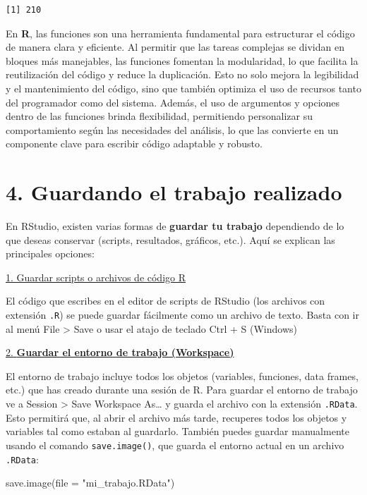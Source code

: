 \documentclass[
  letterpaper,
  DIV=11,
  numbers=noendperiod]{scrreprt}
\newenvironment{Shaded}{\begin{snugshade}}{\end{snugshade}}
\newcommand{\AttributeTok}[1]{\textcolor[rgb]{0.40,0.45,0.13}{#1}}
\newcommand{\FunctionTok}[1]{\textcolor[rgb]{0.28,0.35,0.67}{#1}}
\newcommand{\NormalTok}[1]{\textcolor[rgb]{0.00,0.23,0.31}{#1}}
\newcommand{\StringTok}[1]{\textcolor[rgb]{0.13,0.47,0.30}{#1}}
\begin{document}
\begin{verbatim}
[1] 210
\end{verbatim}

En \textbf{R}, las funciones son una herramienta fundamental para
estructurar el código de manera clara y eficiente. Al permitir que las
tareas complejas se dividan en bloques más manejables, las funciones
fomentan la modularidad, lo que facilita la reutilización del código y
reduce la duplicación. Esto no solo mejora la legibilidad y el
mantenimiento del código, sino que también optimiza el uso de recursos
tanto del programador como del sistema. Además, el uso de argumentos y
opciones dentro de las funciones brinda flexibilidad, permitiendo
personalizar su comportamiento según las necesidades del análisis, lo
que las convierte en un componente clave para escribir código adaptable
y robusto.

\hypertarget{guardando-el-trabajo-realizado}{%
\section{4. Guardando el trabajo
realizado}\label{guardando-el-trabajo-realizado}}

En RStudio, existen varias formas de \textbf{guardar tu trabajo}
dependiendo de lo que deseas conservar (scripts, resultados, gráficos,
etc.). Aquí se explican las principales opciones:

\uline{1. Guardar scripts o archivos de código R}

El código que escribes en el editor de scripts de RStudio (los archivos
con extensión \texttt{.R}) se puede guardar fácilmente como un archivo
de texto. Basta con ir al menú File \textgreater{} Save o usar el atajo
de teclado Ctrl + S (Windows)

\uline{2. \textbf{Guardar el entorno de trabajo (Workspace)}}

El entorno de trabajo incluye todos los objetos (variables, funciones,
data frames, etc.) que has creado durante una sesión de R. Para guardar
el entorno de trabajo ve a Session \textgreater{} Save Workspace
As\ldots{} y guarda el archivo con la extensión \texttt{.RData}. Esto
permitirá que, al abrir el archivo más tarde, recuperes todos los
objetos y variables tal como estaban al guardarlo. También puedes
guardar manualmente usando el comando \texttt{save.image()}, que guarda
el entorno actual en un archivo \texttt{.RData}:

\begin{Shaded}
\begin{Highlighting}[]
\FunctionTok{save.image}\NormalTok{(}\AttributeTok{file =} \StringTok{"mi\_trabajo.RData"}\NormalTok{) }
\end{Highlighting}
\end{Shaded}
\end{document}
